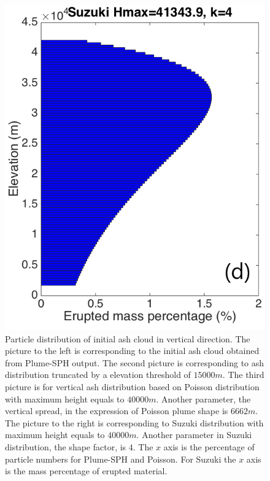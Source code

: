 \documentclass[draft,linenumbers]{agujournal2019}
\begin{document}
\begin{figure}[!htb]
\begin{minipage}{.247 \textwidth}
\end{minipage}%
\begin{minipage}{.247 \textwidth}
\centering
\includegraphics[width=0.99 \textwidth]{Figures/Suzuki-Hmax40k-ParticleDis-z}
\end{minipage}%
\caption{Particle distribution of initial ash cloud in vertical direction. The picture to the left is corresponding to the initial ash cloud obtained from Plume-SPH output. The second picture is corresponding to ash distribution truncated by a elevation threshold of $15000 m$. The third picture is for vertical ash distribution based on Poisson distribution with maximum height equals to $40000 m$. Another parameter, the vertical spread, in the expression of Poisson plume shape is $6662 m$. The picture to the right is corresponding to Suzuki distribution with maximum height equals to $40000 m$. Another parameter in Suzuki distribution, the shape factor, is $4$. The $x$ axis is the percentage of particle numbers for Plume-SPH and Poisson. For Suzuki the $x$ axis is the mass percentage of erupted material.}
\label{fig:Particle-distribution-Plume-SPH-vs-semiempirical}
\end{figure}
\end{document}
